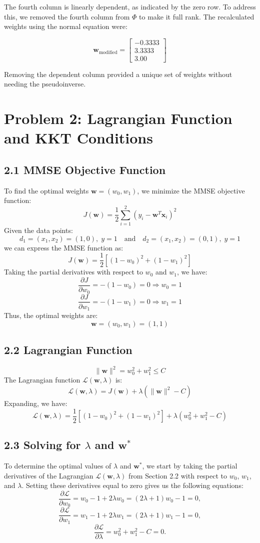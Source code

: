 \documentclass[12pt]{article}
\begin{document}
The fourth column is linearly dependent, as indicated by the zero row. To address this, we removed the fourth column from \(\Phi\) to make it full rank. The recalculated weights using the normal equation were:

\[
\mathbf{w}_{\text{modified}} = \begin{bmatrix} -0.3333 \\ 3.3333 \\ 3.00 \end{bmatrix}
\]

Removing the dependent column provided a unique set of weights without needing the pseudoinverse.

\section*{Problem 2: Lagrangian Function and KKT Conditions}

\subsection*{2.1 MMSE Objective Function}
To find the optimal weights \(\mathbf{w} = (w_0, w_1)\), we minimize the MMSE objective function:
\[
J(\mathbf{w}) = \frac{1}{2} \sum_{i=1}^{2} (y_i - \mathbf{w}^T \mathbf{x}_i)^2
\]
Given the data points:
\[
d_1 = (x_1, x_2) = (1, 0), \; y = 1 \quad \text{and} \quad d_2 = (x_1, x_2) = (0, 1), \; y = 1
\]
we can express the MMSE function as:
\[
J(\mathbf{w}) = \frac{1}{2} [(1 - w_0)^2 + (1 - w_1)^2]
\]
Taking the partial derivatives with respect to \( w_0 \) and \( w_1 \), we have:
\[
\frac{\partial J}{\partial w_0} = -(1 - w_0) = 0 \Rightarrow w_0 = 1
\]
\[
\frac{\partial J}{\partial w_1} = -(1 - w_1) = 0 \Rightarrow w_1 = 1
\]
Thus, the optimal weights are:
\[
\mathbf{w} = (w_0, w_1) = (1, 1)
\]

\subsection*{2.2 Lagrangian Function}
\[
\|\mathbf{w}\|^2 = w_0^2 + w_1^2 \leq C
\]
The Lagrangian function \( \mathcal{L}(\mathbf{w}, \lambda) \) is:
\[
\mathcal{L}(\mathbf{w}, \lambda) = J(\mathbf{w}) + \lambda (\|\mathbf{w}\|^2 - C)
\]
Expanding, we have:
\[
\mathcal{L}(\mathbf{w}, \lambda) = \frac{1}{2} [(1 - w_0)^2 + (1 - w_1)^2] + \lambda (w_0^2 + w_1^2 - C)
\]

\subsection*{2.3 Solving for \( \lambda \) and \( \mathbf{w}^* \)}
To determine the optimal values of \( \lambda \) and \( \mathbf{w}^* \), we start by taking the partial derivatives of the Lagrangian \( \mathcal{L}(\mathbf{w}, \lambda) \) from Section 2.2 with respect to \( w_0 \), \( w_1 \), and \( \lambda \). Setting these derivatives equal to zero gives us the following equations:
\[
\frac{\partial \mathcal{L}}{\partial w_0} = w_0 - 1 + 2\lambda w_0 = (2\lambda + 1)w_0 - 1 = 0,
\]
\[
\frac{\partial \mathcal{L}}{\partial w_1} = w_1 - 1 + 2\lambda w_1 = (2\lambda + 1)w_1 - 1 = 0,
\]
\[
\frac{\partial \mathcal{L}}{\partial \lambda} = w_0^2 + w_1^2 - C = 0.
\]
\end{document}

